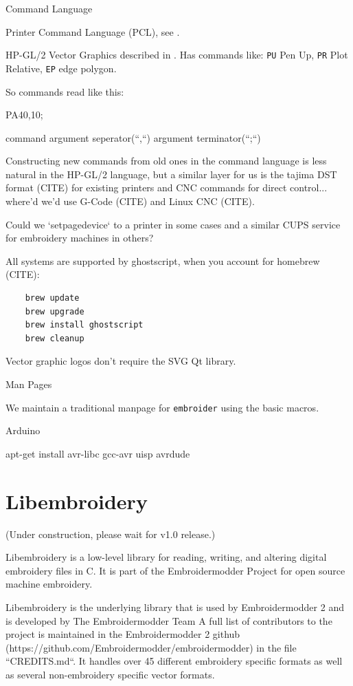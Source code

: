 \documentclass[a4paper]{report}
\begin{document}
Command Language
~~~~~~~~~~~~~~~~

Printer Command Language (PCL), see \citet{packard1992pcl}.

HP-GL/2 Vector Graphics  described in \citet{packard1992pcl}.
Has commands like: \texttt{PU} Pen Up, \texttt{PR} Plot Relative,
\texttt{EP} edge polygon.

So commands read like this:

    PA40,10;

command argument seperator(``,``) argument terminator(``;``)

Constructing new commands from old ones in the command language is less
natural in the HP-GL/2 language, but a similar layer for us is
the tajima DST format (CITE) for existing printers and CNC commands for
direct control... where'd we'd use G-Code (CITE) and Linux CNC (CITE).

Could we `setpagedevice` to a printer in some cases and a similar CUPS service
for embroidery machines in others?

All systems are supported by ghostscript, when you account for homebrew (CITE):

\begin{lstlisting}
    brew update
    brew upgrade
    brew install ghostscript
    brew cleanup
\end{lstlisting}

Vector graphic logos don't require the SVG Qt library.

Man Pages
~~~~~~~~~

We maintain a traditional manpage for \texttt{embroider} using
the basic macros.

Arduino
~~~~~~~

    apt-get install avr-libc gcc-avr uisp avrdude

\chapter{Libembroidery}

(Under construction, please wait for v1.0 release.)

Libembroidery is a low-level library for reading, writing,
and altering digital embroidery files in C. It is part of the Embroidermodder Project
for open source machine embroidery.

Libembroidery is the underlying library that is used by Embroidermodder 2
and is developed by  The Embroidermodder Team %
A full list of contributors to the project is maintained in
the Embroidermodder 2 github (https://github.com/Embroidermodder/embroidermodder)
in the file ``CREDITS.md``. It handles over 45 different embroidery specific formats as well
as several non-embroidery specific vector formats.
\end{document}
